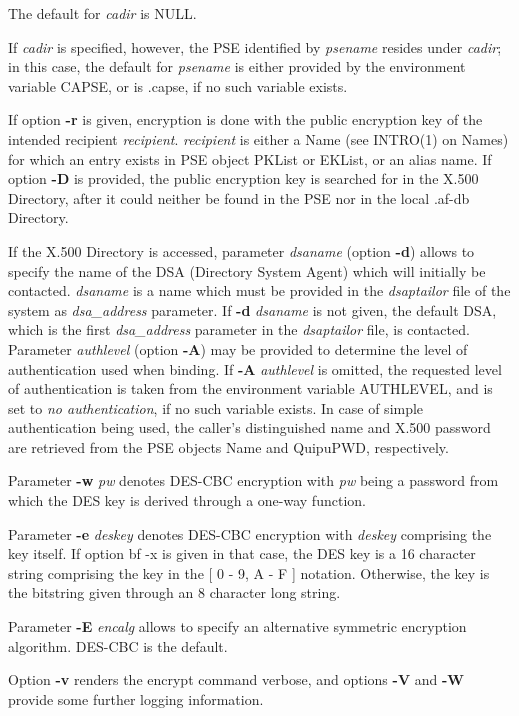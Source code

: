 The default for {\em cadir} is NULL. 

If {\em cadir} is specified,
however, the PSE identified by {\em psename} resides under {\em cadir}; in this case, the default
for {\em psename} is either provided by the environment variable CAPSE, or is .capse, if no such variable
exists. 
 
If option {\bf -r} is given, encryption is done with the public encryption key
of the intended recipient {\em recipient}. {\em recipient} is either a Name (see INTRO(1) on Names)
for which an entry exists in PSE object PKList or EKList, or an alias name. If option {\bf -D}
is provided, the public encryption key is searched for in the X.500 Directory, after it could
neither be found in the PSE nor in the local .af-db Directory.
 
If the X.500 Directory is accessed, parameter {\em dsaname} (option {\bf -d}) allows to specify the name of the DSA (Directory System Agent) which
will initially be contacted. {\em dsaname} is a name which must be provided in the 
{\em dsaptailor} file of the system as {\em dsa\_address} parameter. If {\bf -d} {\em dsaname} is
not given, the default DSA, which is the first {\em dsa\_address} parameter in the {\em dsaptailor} 
file, is contacted.
Parameter {\em authlevel} (option {\bf -A}) may be provided to determine the level of authentication used when binding. If {\bf -A} {\em authlevel} is omitted, the requested 
level of authentication is taken from the environment variable AUTHLEVEL, and is set to {\em no 
authentication}, if no such variable exists.
In case of simple authentication being used, the caller's distinguished name and
X.500 password are retrieved from the PSE objects Name and QuipuPWD, respectively.
 
Parameter {\bf -w} {\em pw} denotes DES-CBC encryption with {\em pw} being a password from which the 
DES key 
is derived through a one-way function.
 
Parameter {\bf -e} {\em deskey} denotes DES-CBC encryption with {\em deskey} comprising the key itself.
If option {bf -x} is given in that case, the DES key is a 16 character string comprising
the key in the [ 0 - 9, A - F ] notation. Otherwise, the key is the bitstring given through
an 8 character long string.

Parameter {\bf -E} {\em encalg} allows to specify an alternative symmetric encryption algorithm.
DES-CBC is the default.

Option {\bf -v} renders the encrypt command verbose, and options {\bf -V} and {\bf -W} provide
some further logging information.

